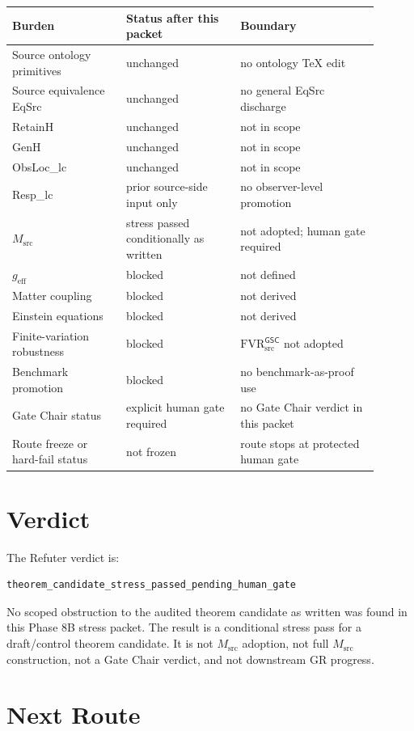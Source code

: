 \documentclass[11pt]{article}
\newcommand{\Msrc}{M_{\mathrm{src}}}
\newcommand{\FVR}{\mathrm{FVR}_{\mathrm{src}}^{\mathsf{GSC}}}
\begin{document}
\begin{longtable}{p{0.28\linewidth}p{0.28\linewidth}p{0.34\linewidth}}
\toprule
Burden & Status after this packet & Boundary \\
\midrule
Source ontology primitives & unchanged & no ontology TeX edit \\
Source equivalence EqSrc & unchanged & no general EqSrc discharge \\
RetainH & unchanged & not in scope \\
GenH & unchanged & not in scope \\
ObsLoc\_lc & unchanged & not in scope \\
Resp\_lc & prior source-side input only & no observer-level promotion \\
\(\Msrc\) & stress passed conditionally as written & not adopted; human gate required \\
\(g_{\mathrm{eff}}\) & blocked & not defined \\
Matter coupling & blocked & not derived \\
Einstein equations & blocked & not derived \\
Finite-variation robustness & blocked & \(\FVR\) not adopted \\
Benchmark promotion & blocked & no benchmark-as-proof use \\
Gate Chair status & explicit human gate required & no Gate Chair verdict in this packet \\
Route freeze or hard-fail status & not frozen & route stops at protected human gate \\
\bottomrule
\end{longtable}

\section{Verdict}

The Refuter verdict is:

\begin{verbatim}
theorem_candidate_stress_passed_pending_human_gate
\end{verbatim}

No scoped obstruction to the audited theorem candidate as written was found in
this Phase 8B stress packet. The result is a conditional stress pass for a
draft/control theorem candidate. It is not \(\Msrc\) adoption, not full
\(\Msrc\) construction, not a Gate Chair verdict, and not downstream GR
progress.

\section{Next Route}
\end{document}

